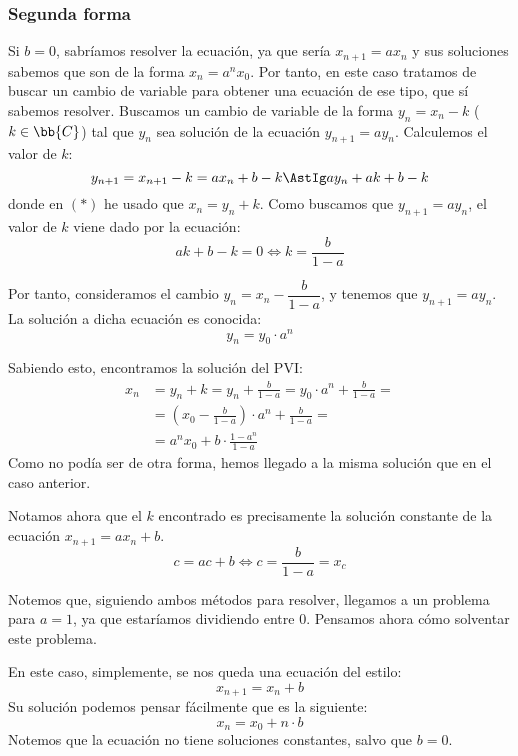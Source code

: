 \subsubsection{Segunda forma}
Si $b = 0$, sabríamos resolver la ecuación, ya que sería $x_{n+1} = ax_n$
y sus soluciones sabemos que son de la forma $x_n = a^n x_0$.
Por tanto, en este caso tratamos de buscar un cambio de variable para obtener una ecuación de ese tipo, que sí sabemos resolver. Buscamos un cambio de variable de la forma $y_n = x_n - k$ ($k \in \bb{C}$) tal que $y_n$ sea solución de la ecuación $y_{n+1} = ay_n$. Calculemos el valor de $k$:
$$y_{n+1} = x_{n+1} - k = ax_n + b - k \AstIg ay_n + ak + b - k$$
donde en $(\ast)$ he usado que $x_n = y_n + k$.
Como buscamos que $y_{n+1} = ay_n$, el valor de $k$ viene dado por la ecuación:
\begin{equation*}
    ak + b - k = 0 \Longleftrightarrow k = \frac{b}{1-a}
\end{equation*}

Por tanto, consideramos el cambio $y_n = x_n - \dfrac{b}{1-a}$, y tenemos que $y_{n+1} = ay_n$. La solución a dicha ecuación es conocida:
$$y_n = y_0\cdot a^n$$

Sabiendo esto, encontramos la solución del PVI:
\begin{align*}
    x_n &= y_{n} + k = y_n + \frac{b}{1-a} = y_0\cdot a^n + \frac{b}{1-a}
    =\\&= \left(x_0 - \frac{b}{1-a}\right)\cdot a^n + \frac{b}{1-a}
    =\\&= a^nx_0 + b\cdot \frac{1-a^n}{1-a}
\end{align*}
Como no podía ser de otra forma, hemos llegado a la misma solución que en el caso anterior.

\begin{observacion}
Notamos ahora que el $k$ encontrado es precisamente la solución constante de la ecuación $x_{n+1} = ax_n + b$.
\begin{equation*}
    c = ac + b \Longleftrightarrow c = \frac{b}{1-a} = x_c
\end{equation*}
\end{observacion}

\begin{observacion}
    Notemos que, siguiendo ambos métodos para resolver, llegamos a un problema para $a = 1$, ya que estaríamos dividiendo entre $0$. Pensamos ahora cómo solventar este problema.

    En este caso, simplemente, se nos queda una ecuación del estilo:
    $$x_{n+1} = x_n + b$$
    Su solución podemos pensar fácilmente que es la siguiente:
    $$x_n = x_0 + n\cdot b$$
    Notemos que la ecuación no tiene soluciones constantes, salvo que $b = 0$.
\end{observacion}

